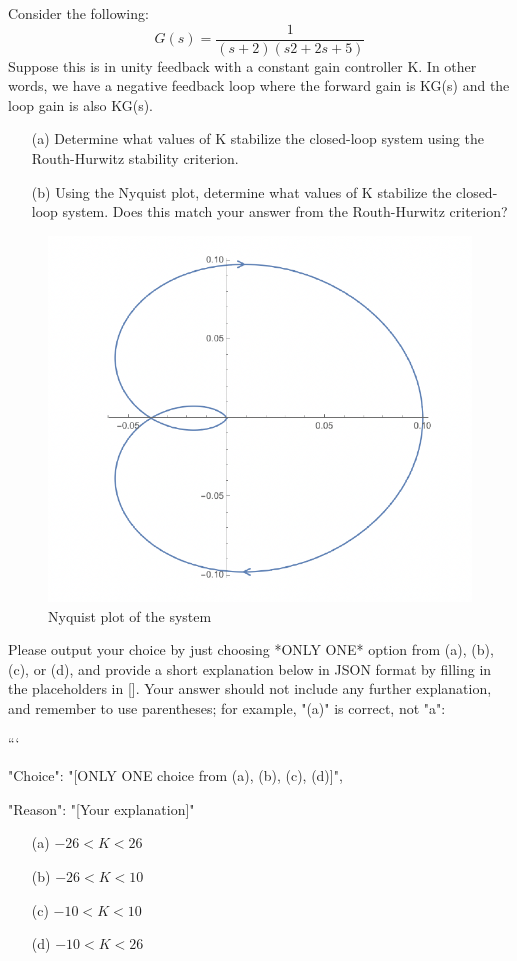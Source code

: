 \documentclass[12pt]{article}
\begin{document}
Consider the following:
$$G(s) =\frac{1}{(s + 2)(s2 + 2s + 5)}$$
Suppose this is in unity feedback with a constant gain controller K. In other words, we have a
negative feedback loop where the forward gain is KG(s) and the loop gain is also KG(s). 
\begin{itemize}
    \item [(a)] Determine what values of K stabilize the closed-loop system using the Routh-Hurwitz stability criterion. 
    \item [(b)] Using the Nyquist plot, determine what values of K stabilize the closed-loop system. Does this match your answer from the Routh-Hurwitz criterion?
\end{itemize}
    \begin{figure}[h!]
        \centering
        \includegraphics[width=0.5\linewidth]{figs/8.3.png}
        \caption{Nyquist plot of the system}
        \label{fig:prb12}
    \end{figure}

Please output your choice by just choosing *ONLY ONE* option from (a), (b), (c), or (d), and provide a short explanation below in JSON format by filling in the placeholders in []. Your answer should not include any further explanation, and remember to use parentheses; for example, "(a)" is correct, not "a":

```
{

"Choice": "[ONLY ONE choice from (a), (b), (c), (d)]",

"Reason": "[Your explanation]"

}

\begin{itemize}
    \item[(a)] \(-26<K<26\)
    \item[(b)] \(-26<K<10\)
    \item[(c)] \(-10<K<10\)
    \item[(d)] \(-10<K<26\)
\end{itemize}
\end{document}
